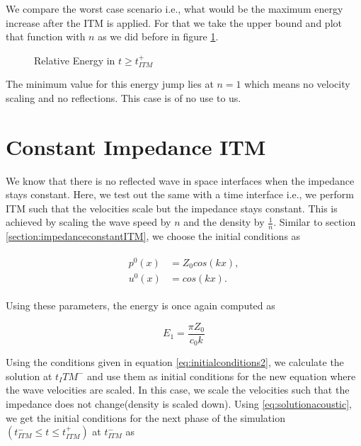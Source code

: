 We compare the worst case scenario i.e., what would be the maximum energy increase after the ITM is applied. For that we take the upper bound and plot that function with $n$ as we did before in figure \ref{fig:ratio2}.

\begin{figure}
    \centering
    \caption{Relative Energy in $t \geq t_{ITM}^+$}
    \label{fig:ratio2}
\end{figure}

The minimum value for this energy jump lies at $n=1$ which means no velocity scaling and no reflections. This case is of no use to us.

\section{Constant Impedance \ac{ITM}}
We know that there is no reflected wave in space interfaces when the impedance stays constant. Here, we test out the same with a time interface i.e., we perform \ac{ITM} such that the velocities scale but the impedance stays constant. This is achieved by scaling the wave speed by $n$ and the density by $\frac{1}{n}$.
Similar to section \ref{section:impedanceconstantITM}, we choose the initial conditions as

\begin{align}
    \begin{split}
        p^0\left(x\right) &= Z_0cos\left(kx\right), \\
        u^0\left(x\right) &= cos\left(kx\right) .
    \end{split}
    \label{eq:initialconditions2}
\end{align}

Using these parameters, the energy is once again computed as

\begin{equation}
    E_1 = \frac{\pi Z_0}{c_0 k}
\end{equation}

Using the conditions given in equation \ref{eq:initialconditions2}, we calculate the solution at $t_ITM^-$ and use them as initial conditions for the new equation where the wave velocities are scaled.
In this case, we scale the velocities such that the impedance does not change(density is scaled down). Using \ref{eq:solutionacoustic}, we get the initial conditions for the next phase of the simulation$\left(t_{ITM}^- \leq t \leq t_{ITM}^+ \right)$ at $t_{ITM}^-$ as

